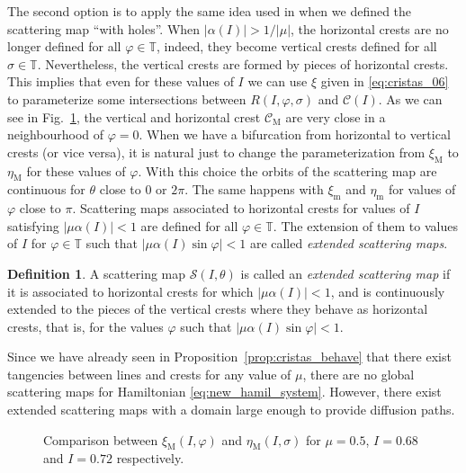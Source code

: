 \documentclass[a4paper,10pt]{article}
\newcommand{\M}{\text{M}}
\newcommand{\m}{\text{m}}
\newcommand{\NH}{\text{NHIM}}
\theoremstyle{definition}
\newtheorem{definition}[theorem]{Definition}
\begin{document}
The second option is to apply the same idea used in \cite{Delshams2017} when we defined the scattering map ``with holes''.
When $\left|\alpha(I)\right| >1/\left|\mu\right|$, the horizontal crests are no longer defined for all $\varphi\in\mathbb{T}$, indeed, they become vertical crests defined for all $\sigma\in\mathbb{T}$. Nevertheless, the vertical crests are formed by pieces of horizontal crests.
This implies that even for these values of $I$ we can use $\xi$ given in \eqref{eq:cristas_06} to parameterize some intersections between $R(I,\varphi ,\sigma)$ and $\mathcal{C}(I)$.
As we can see in Fig.~\ref{fig:hor_vert_prox}, the vertical and horizontal crest $\mathcal{C}_{\M}$ are very close in a neighbourhood of $\varphi = 0$.
When we have a bifurcation from horizontal to vertical crests (or vice versa), it is natural just to change the parameterization from $\xi_{\M}$ to $\eta_{\M}$ for these values of $\varphi$.
With this choice the orbits of the scattering map are continuous for $\theta$ close to $0$ or $2\pi$.
The same happens with $\xi_{\m}$ and $\eta_{\m}$ for values of $\varphi$ close to $\pi$.
Scattering maps associated to horizontal crests for values of $I$ satisfying $\left|\mu\alpha(I)\right| < 1$ are defined for all $\varphi\in\mathbb{T}$.
The extension of them to values of $I$  for $\varphi\in\mathbb{T}$ such that $\left|\mu\alpha(I)\sin\varphi\right| < 1$ are called \emph{extended scattering maps}.
\begin{definition}
A scattering map $\mathcal{S}(I,\theta)$ is called an \emph{extended scattering map} if it is associated to horizontal crests for which $\left|\mu\alpha(I)\right|<1$, and is continuously extended to the pieces of the vertical crests where they behave as horizontal crests, that is, for the values $\varphi$ such that $\left|\mu\alpha(I)\sin\varphi\right| < 1$.
\end{definition}
Since we have already seen in Proposition~\ref{prop:cristas_behave} that there exist tangencies between {\NH} lines and crests for any value of $\mu$, there are no global scattering maps for Hamiltonian \eqref{eq:new_hamil_system}. However, there exist
extended scattering maps with a domain large enough to provide diffusion paths.
\begin{figure}[h]
\centering
\subfigure[A piece of $\xi_{\M}(I,\varphi)$ for $I = 0.68$.]{\texttt{[image: hor\_crest]}\label{fig:hor_crest_part}}
\qquad
\subfigure[A piece of $\eta_{\M}(I,\sigma)$ for $I = 0.72$.]{\texttt{[image: vert\_crest]}\label{fig:vert_crest_part}}
\qquad
\caption{Comparison between $\xi_{\M}(I,\varphi)$ and $\eta_{\M}(I,\sigma)$ for $\mu = 0.5$, $I = 0.68$ and $I = 0.72$ respectively.\label{fig:hor_vert_prox}}
\end{figure}
\end{document}
